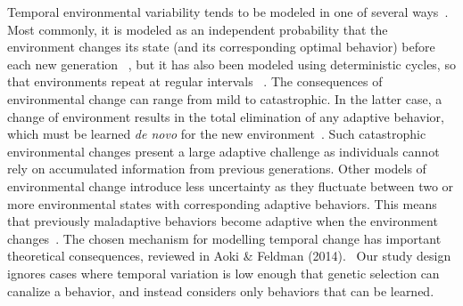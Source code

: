 \documentclass[letterpaper,11.5pt]{scrartcl}
\begin{document}
Temporal environmental variability tends to be modeled in one of 
several ways~\cite{aoki2014evolution}. Most commonly, it is modeled
as an independent probability that the environment changes its state (and its corresponding optimal behavior) before each new generation
~\cite{BoydRicherson1985,Rogers1988,Feldman1996,McElreath2005,Enquist2007,perreault2012bayesian,aoki2014evolution}, but
it has also been modeled using deterministic cycles, so that environments repeat at regular intervals ~\cite{Feldman1996, aoki2014evolution}.
The consequences of environmental change can range from mild to
catastrophic. In the latter case, a change of environment results in the total
elimination of any adaptive behavior, which must be learned \emph{de novo} for the
new environment~\cite{Rogers1988}. Such catastrophic environmental changes present
a large adaptive challenge as individuals cannot rely on accumulated information
from previous generations. Other models of environmental change introduce less
uncertainty as they fluctuate between two or more environmental states with corresponding adaptive behaviors. This means that previously maladaptive
behaviors become adaptive when the environment changes~\cite{perreault2012bayesian}. The chosen mechanism for modelling temporal
change has important theoretical consequences, reviewed in Aoki \& Feldman (2014).~\nocite{aoki2014evolution} Our study design ignores cases where temporal variation is low enough that genetic selection can canalize a behavior, and instead considers only behaviors that can be learned. 
\end{document}
